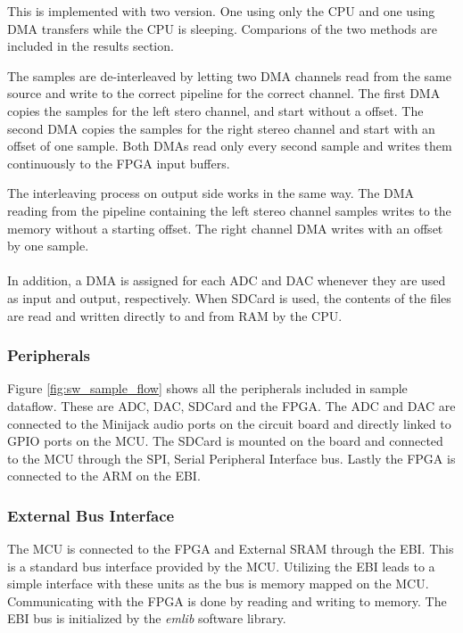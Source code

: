 This is implemented with two version. One using only the CPU and one using DMA transfers
while the CPU is sleeping. Comparions of the two methods are included in the results section.

The samples are de-interleaved by letting two DMA channels read from the same
source and write to the correct pipeline for the correct channel. The first DMA
copies the samples for the left stero channel, and start without a offset. The
second DMA copies the samples for the right stereo channel and start with an
offset of one sample. Both DMAs read only every second sample and writes them
continuously to the FPGA input buffers.

The interleaving process on output side works in the same way. The DMA reading
from the pipeline containing the left stereo channel samples writes to the
memory without a starting offset. The right channel DMA writes with an offset by
one sample.

\paragraph{}
In addition, a DMA is assigned for each ADC and DAC whenever they are used as
input and output, respectively. When SDCard is used, the contents of the files
are read and written directly to and from RAM by the CPU.


\subsubsection{Peripherals}


Figure \ref{fig:sw_sample_flow} shows all the peripherals included in sample dataflow. 
These are ADC, DAC, SDCard and the FPGA. The ADC and DAC are connected to the Minijack
audio ports on the circuit board and directly linked to GPIO ports on the MCU. The SDCard
is mounted on the board and connected to the MCU through the SPI, Serial Peripheral Interface
bus. Lastly the FPGA is connected to the ARM on the EBI.

\subsubsection{External Bus Interface}
The MCU is connected to the FPGA and External SRAM through the EBI. This is a standard
bus interface provided by the MCU. Utilizing the EBI leads to a
simple interface with these units as the bus is memory mapped on the MCU.
Communicating with the FPGA is done by reading and writing to memory.
The EBI bus is initialized by the {\it emlib} software library.

